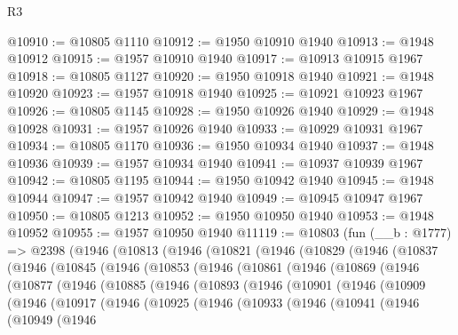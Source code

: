 \begin{lexlean}{R3}
\begin{coremodule}
@10910 := @10805 @1110
@10912 := @1950 @10910 @1940
@10913 := @1948 @10912
@10915 := @1957 @10910 @1940
@10917 := @10913 @10915 @1967
@10918 := @10805 @1127
@10920 := @1950 @10918 @1940
@10921 := @1948 @10920
@10923 := @1957 @10918 @1940
@10925 := @10921 @10923 @1967
@10926 := @10805 @1145
@10928 := @1950 @10926 @1940
@10929 := @1948 @10928
@10931 := @1957 @10926 @1940
@10933 := @10929 @10931 @1967
@10934 := @10805 @1170
@10936 := @1950 @10934 @1940
@10937 := @1948 @10936
@10939 := @1957 @10934 @1940
@10941 := @10937 @10939 @1967
@10942 := @10805 @1195
@10944 := @1950 @10942 @1940
@10945 := @1948 @10944
@10947 := @1957 @10942 @1940
@10949 := @10945 @10947 @1967
@10950 := @10805 @1213
@10952 := @1950 @10950 @1940
@10953 := @1948 @10952
@10955 := @1957 @10950 @1940
@11119 := @10803
    (fun (__b : @1777) =>
    @2398
      (@1946
        (@10813
          (@1946
            (@10821
              (@1946
                (@10829
                  (@1946
                    (@10837
                      (@1946
                        (@10845
                          (@1946
                            (@10853
                              (@1946
                                (@10861
                                  (@1946
                                    (@10869
                                      (@1946
                                        (@10877
                                          (@1946
                                            (@10885
                                              (@1946
                                                (@10893
                                                  (@1946
                                                    (@10901
                                                      (@1946
                                                        (@10909
                                                          (@1946
                                                            (@10917
                                                              (@1946
                                                                (@10925
                                                                  (@1946
                                                                    (@10933
                                                                      (@1946
                                                                        (@10941
                                                                          (@1946
                                                                            (@10949
                                                                              (@1946

\end{coremodule}
\end{lexlean}

